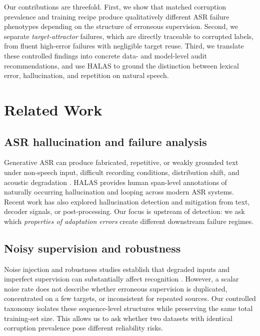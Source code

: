 \documentclass[conference]{IEEEtran}
\begin{document}
Our contributions are threefold. First, we show that matched corruption
prevalence and training recipe produce qualitatively different ASR failure
phenotypes depending on the structure of erroneous supervision. Second, we
separate \emph{target-attractor} failures, which are directly traceable to
corrupted labels, from fluent high-error failures with negligible target reuse.
Third, we translate these controlled findings into concrete data- and
model-level audit recommendations, and use HALAS \cite{baranski2026halas} to
ground the distinction between lexical error, hallucination, and repetition on
natural speech.

\section{Related Work}
\subsection{ASR hallucination and failure analysis}
Generative ASR can produce fabricated, repetitive, or weakly grounded text under
non-speech input, difficult recording conditions, distribution shift, and
acoustic degradation
\cite{koenecke2024careless,atwany2025lost,baranski2025investigation,sridhar25_interspeech,imai-etal-2025-evaluating,Zhang2024}.
HALAS \cite{baranski2026halas} provides human span-level annotations of
naturally occurring hallucination and looping across modern ASR systems. Recent
work has also explored hallucination detection and mitigation from text,
decoder signals, or post-processing. Our focus is upstream of detection: we ask
which \emph{properties of adaptation errors} create different downstream
failure regimes.

\subsection{Noisy supervision and robustness}
Noise injection and robustness studies establish that degraded inputs and
imperfect supervision can substantially affect recognition
\cite{Fetic2021TopicMR,morales2007adding,Iwamoto2022HowBA}. However, a scalar
noise rate does not describe whether erroneous supervision is duplicated,
concentrated on a few targets, or inconsistent for repeated sources. Our
controlled taxonomy isolates these sequence-level structures while preserving
the same total training-set size. This allows us to ask whether two datasets
with identical corruption prevalence pose different reliability risks.
\end{document}
